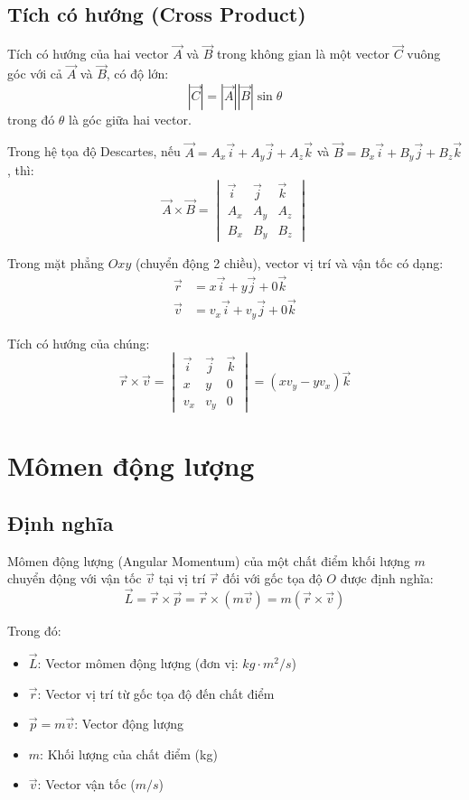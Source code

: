 \documentclass{report}
\begin{document}
\subsection{Tích có hướng (Cross Product)}
Tích có hướng của hai vector $\vec{A}$ và $\vec{B}$ trong không gian là một vector $\vec{C}$ vuông góc với cả $\vec{A}$ và $\vec{B}$, có độ lớn:
\[|\vec{C}| = |\vec{A}||\vec{B}|\sin\theta\]
trong đó $\theta$ là góc giữa hai vector.

Trong hệ tọa độ Descartes, nếu $\vec{A} = A_x\vec{i} + A_y\vec{j} + A_z\vec{k}$ và $\vec{B} = B_x\vec{i} + B_y\vec{j} + B_z\vec{k}$, thì:
\[\vec{A} \times \vec{B} = \begin{vmatrix}
\vec{i} & \vec{j} & \vec{k} \\
A_x & A_y & A_z \\
B_x & B_y & B_z
\end{vmatrix}\]

Trong mặt phẳng $Oxy$ (chuyển động 2 chiều), vector vị trí và vận tốc có dạng:
\begin{align*}
\vec{r} &= x\vec{i} + y\vec{j} + 0\vec{k}\\
\vec{v} &= v_x\vec{i} + v_y\vec{j} + 0\vec{k}
\end{align*}

Tích có hướng của chúng:
\[\vec{r} \times \vec{v} = \begin{vmatrix}
\vec{i} & \vec{j} & \vec{k} \\
x & y & 0 \\
v_x & v_y & 0
\end{vmatrix} = (xv_y - yv_x)\vec{k}\]

\section{Mômen động lượng}

\subsection{Định nghĩa}
Mômen động lượng (Angular Momentum) của một chất điểm khối lượng $m$ chuyển động với vận tốc $\vec{v}$ tại vị trí $\vec{r}$ đối với gốc tọa độ $O$ được định nghĩa:
\[\vec{L} = \vec{r} \times \vec{p} = \vec{r} \times (m\vec{v}) = m(\vec{r} \times \vec{v})\]

Trong đó:
\begin{itemize}
    \item $\vec{L}$: Vector mômen động lượng (đơn vị: $kg \cdot m^2/s$)
    \item $\vec{r}$: Vector vị trí từ gốc tọa độ đến chất điểm
    \item $\vec{p} = m\vec{v}$: Vector động lượng
    \item $m$: Khối lượng của chất điểm (kg)
    \item $\vec{v}$: Vector vận tốc ($m/s$)
\end{itemize}
\end{document}
